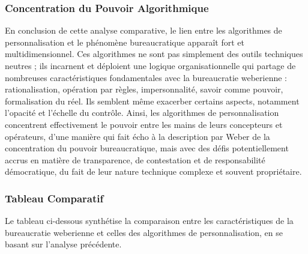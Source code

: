\documentclass[10pt, twocolumn]{article}
\begin{document}
\subsubsection{Concentration du Pouvoir Algorithmique}
En conclusion de cette analyse comparative, le lien entre les algorithmes de personnalisation et le phénomène bureaucratique apparaît fort et multidimensionnel. Ces algorithmes ne sont pas simplement des outils techniques neutres ; ils incarnent et déploient une logique organisationnelle qui partage de nombreuses caractéristiques fondamentales avec la bureaucratie weberienne : rationalisation, opération par règles, impersonnalité, savoir comme pouvoir, formalisation du réel. Ils semblent même exacerber certains aspects, notamment l'opacité et l'échelle du contrôle. Ainsi, les algorithmes de personnalisation concentrent effectivement le pouvoir entre les mains de leurs concepteurs et opérateurs, d'une manière qui fait écho à la description par Weber de la concentration du pouvoir bureaucratique, mais avec des défis potentiellement accrus en matière de transparence, de contestation et de responsabilité démocratique, du fait de leur nature technique complexe et souvent propriétaire.

\subsubsection{Tableau Comparatif}

Le tableau ci-dessous synthétise la comparaison entre les caractéristiques de la bureaucratie weberienne et celles des algorithmes de personnalisation, en se basant sur l'analyse précédente.
\end{document}
